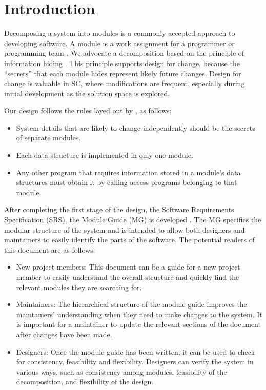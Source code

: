 \documentclass[12pt, titlepage]{article}
\begin{document}
\newpage

\tableofcontents

\newpage


\section{Introduction}

Decomposing a system into modules is a commonly accepted approach to developing
software.  A module is a work assignment for a programmer or programming
team \cite{ParnasEtAl1984}.  We advocate a decomposition
based on the principle of information hiding \cite{Parnas:1972}.  This
principle supports design for change, because the ``secrets'' that each module
hides represent likely future changes.  Design for change is valuable in SC,
where modifications are frequent, especially during initial development as the
solution space is explored.  

Our design follows the rules layed out by \cite{ParnasEtAl1984}, as follows:
\begin{itemize}
\item System details that are likely to change independently should be the
  secrets of separate modules.
\item Each data structure is implemented in only one module.
\item Any other program that requires information stored in a module's data
  structures must obtain it by calling access programs belonging to that module.
\end{itemize}

After completing the first stage of the design, the Software Requirements
Specification (SRS), the Module Guide (MG) is developed \cite{ParnasEtAl1984}. The MG
specifies the modular structure of the system and is intended to allow both
designers and maintainers to easily identify the parts of the software.  The
potential readers of this document are as follows:

\begin{itemize}
\item New project members: This document can be a guide for a new project member
  to easily understand the overall structure and quickly find the
  relevant modules they are searching for.
\item Maintainers: The hierarchical structure of the module guide improves the
  maintainers' understanding when they need to make changes to the system. It is
  important for a maintainer to update the relevant sections of the document
  after changes have been made.
\item Designers: Once the module guide has been written, it can be used to
  check for consistency, feasibility and flexibility. Designers can verify the
  system in various ways, such as consistency among modules, feasibility of the
  decomposition, and flexibility of the design.
\end{itemize}
\end{document}
